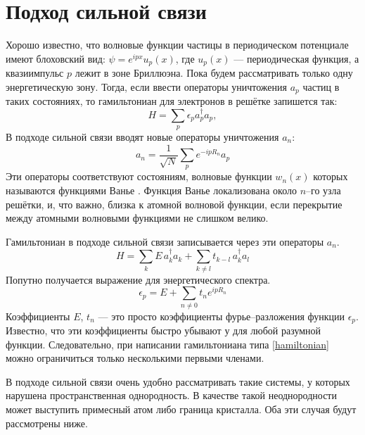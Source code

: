 \section{Подход сильной связи}
	Хорошо известно, что волновые функции частицы в периодическом потенциале 
	имеют блоховский вид: $\psi = e^{ipx} u_p(x)$, где $u_p(x)$ --- периодическая 
	функция, а квазиимпульс $p$ лежит в зоне Бриллюэна. Пока будем рассматривать
	только одну энергетическую зону. Тогда, если ввести операторы
	уничтожения $a_p$ частиц в таких состояниях, то 
	гамильтониан для электронов в решётке запишется так:
	\begin{equation}
		H = \sum_p \epsilon_p a_p^{\dagger} a_p,
	\end{equation}
	В подходе сильной связи вводят новые операторы уничтожения $a_n$:
	\begin{equation}
		a_n = \frac{1}{\sqrt{N}} \sum_p e^{-ipR_n} a_p
	\end{equation}
	Эти операторы соответствуют состояниям, волновые функции $w_n(x)$ которых называются 
	функциями Ванье \cite{Anselm1978}. 
	Функция Ванье локализована около $n$--го узла решётки, и, что
	важно, близка к атомной волновой функции, если перекрытие между атомными
	волновыми функциями не слишком велико.

	Гамильтониан в подходе сильной связи записывается через эти операторы $a_n$. 
	\begin{equation}
		\label{hamiltonian}
		H = \sum_k E\,a_k^{\dagger}a_k + \sum_{k\ne l} t_{k-l}\, a_k^{\dagger} a_l
	\end{equation}
	Попутно получается  выражение для энергетического спектра.
	\begin{equation}
		\epsilon_p = E + \sum_{n\ne 0} t_n e^{ipR_n}
	\end{equation}
	Коэффициенты $E$, $t_n$ --- это просто коэффициенты фурье--разложения функции 
	$\epsilon_p$. Известно, что эти коэффициенты быстро убывают у для любой 
	разумной функции. Следовательно, при написании гамильтониана типа \eqref{hamiltonian}
	можно ограничиться только несколькими первыми членами.

	В подходе сильной связи очень удобно рассматривать такие системы, у которых 
	нарушена пространственная однородность. В качестве такой неоднородности может выступить
	примесный атом либо граница кристалла. Оба эти случая будут рассмотрены ниже.


